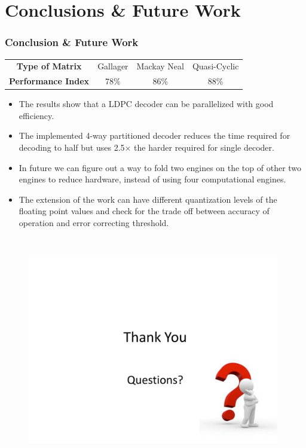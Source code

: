 \documentclass[xcolor=dvipsname]
{beamer}
\begin{document}
\section{Conclusions \& Future Work}
		\begin{frame} 
			\frametitle{Conclusion \& Future Work}
			
\begin{center}
\begin{tabular}{@{}cccc@{}}
\toprule
\textbf{Type of Matrix} & Gallager & Mackay Neal  &  Quasi-Cyclic  \\ 
\textbf{Performance Index} &  78\% & 86\% & 88\% \\ \bottomrule
\end{tabular}
\end{center}


\begin{itemize}
[triangle]
\item The results show that a LDPC decoder can be parallelized with good efficiency.
\item The implemented 4-way partitioned decoder reduces the time required for decoding to half but uses 2.5$\times$ the harder required for single decoder.  
\item In future we can figure out a way to fold two engines on the top of other two engines to reduce hardware, instead of using four computational engines. 
\item The extension of the work can have different quantization levels of the floating point values and check for the trade off between accuracy of operation and error correcting threshold.
\end{itemize}
\end{frame}




\begin{frame}[plain]
\vspace{-20mm}
 			\begin{figure}
			\includegraphics[height=10cm,width=11cm]{end}
			\end{figure}   
\end{frame}	
\end{document}
